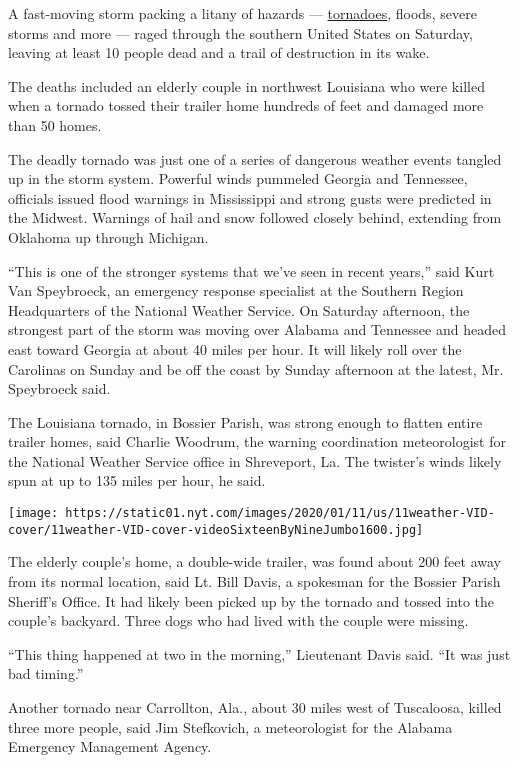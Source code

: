A fast-moving storm packing a litany of hazards ---
\href{https://www.nytimes.com/2020/03/03/us/nashville-tornado-live.html}{tornadoes},
floods, severe storms and more --- raged through the southern United
States on Saturday, leaving at least 10 people dead and a trail of
destruction in its wake.

The deaths included an elderly couple in northwest Louisiana who were
killed when a tornado tossed their trailer home hundreds of feet and
damaged more than 50 homes.

The deadly tornado was just one of a series of dangerous weather events
tangled up in the storm system. Powerful winds pummeled Georgia and
Tennessee, officials issued flood warnings in Mississippi and strong
gusts were predicted in the Midwest. Warnings of hail and snow followed
closely behind, extending from Oklahoma up through Michigan.

``This is one of the stronger systems that we've seen in recent years,''
said Kurt Van Speybroeck, an emergency response specialist at the
Southern Region Headquarters of the National Weather Service. On
Saturday afternoon, the strongest part of the storm was moving over
Alabama and Tennessee and headed east toward Georgia at about 40 miles
per hour. It will likely roll over the Carolinas on Sunday and be off
the coast by Sunday afternoon at the latest, Mr. Speybroeck said.

The Louisiana tornado, in Bossier Parish, was strong enough to flatten
entire trailer homes, said Charlie Woodrum, the warning coordination
meteorologist for the National Weather Service office in Shreveport, La.
The twister's winds likely spun at up to 135 miles per hour, he said.

\texttt{[image: https://static01.nyt.com/images/2020/01/11/us/11weather-VID-cover/11weather-VID-cover-videoSixteenByNineJumbo1600.jpg]}

The elderly couple's home, a double-wide trailer, was found about 200
feet away from its normal location, said Lt. Bill Davis, a spokesman for
the Bossier Parish Sheriff's Office. It had likely been picked up by the
tornado and tossed into the couple's backyard. Three dogs who had lived
with the couple were missing.

``This thing happened at two in the morning,'' Lieutenant Davis said.
``It was just bad timing.''

Another tornado near Carrollton, Ala., about 30 miles west of
Tuscaloosa, killed three more people, said Jim Stefkovich, a
meteorologist for the Alabama Emergency Management Agency.

